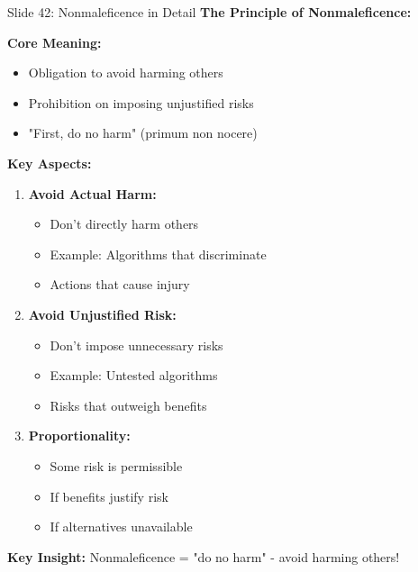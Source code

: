 \documentclass[8pt]{beamer}
\begin{document}
	\begin{frame}{Slide 42: Nonmaleficence in Detail}
		\fontsize{6.5}{7.5}\selectfont
		\textbf{The Principle of Nonmaleficence:}
		
		\vspace{0.1cm}
		\textbf{Core Meaning:}
		\begin{itemize}
			\item Obligation to avoid harming others
			\item Prohibition on imposing unjustified risks
			\item "First, do no harm" (primum non nocere)
		\end{itemize}
		
		\vspace{0.1cm}
		\textbf{Key Aspects:}
		\begin{enumerate}
			\item \textbf{Avoid Actual Harm:}
			\begin{itemize}
				\item Don't directly harm others
				\item Example: Algorithms that discriminate
				\item Actions that cause injury
			\end{itemize}
			\item \textbf{Avoid Unjustified Risk:}
			\begin{itemize}
				\item Don't impose unnecessary risks
				\item Example: Untested algorithms
				\item Risks that outweigh benefits
			\end{itemize}
			\item \textbf{Proportionality:}
			\begin{itemize}
				\item Some risk is permissible
				\item If benefits justify risk
				\item If alternatives unavailable
			\end{itemize}
		\end{enumerate}
		
		\textcolor{myblue}{\textbf{Key Insight:}} Nonmaleficence = \textcolor{myblue}{"do no harm"} - avoid harming others!
	\end{frame}
	
\end{document}
